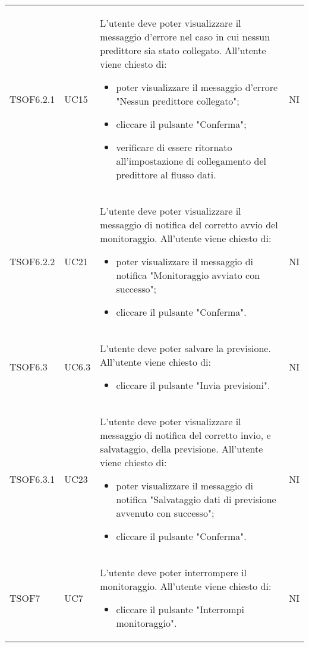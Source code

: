 \begin{longtable}{C{2.5cm} C{2.5cm} L{8cm} C{2cm}}
TSOF6.2.1 & UC15 & L'utente  deve poter visualizzare il messaggio d’errore nel caso in cui nessun predittore sia stato collegato. \newline All’utente viene chiesto di:
\begin{itemize}
	\item poter visualizzare il messaggio d’errore "Nessun predittore collegato";
	\item cliccare il pulsante "Conferma";
	\item verificare di essere ritornato all’impostazione di collegamento del predittore al flusso dati.
\end{itemize}& NI \\
TSOF6.2.2 & UC21 & L'utente  deve poter visualizzare il messaggio di notifica del corretto avvio del monitoraggio. \newline All'utente viene chiesto di: 
\begin{itemize}
	\item poter visualizzare il messaggio di notifica "Monitoraggio avviato con successo";
	\item cliccare il pulsante "Conferma".
\end{itemize} & NI \\
TSOF6.3 & UC6.3 & L'utente  deve poter salvare la previsione. \newline All'utente viene chiesto di: \begin{itemize}
\item cliccare il pulsante "Invia previsioni".
\end{itemize} & NI \\
TSOF6.3.1 & UC23 & L'utente  deve poter visualizzare il messaggio di notifica del corretto invio, e salvataggio, della previsione. \newline All'utente viene chiesto di: 
\begin{itemize}
	\item poter visualizzare il messaggio di notifica "Salvataggio dati di previsione avvenuto con successo";
	\item cliccare il pulsante "Conferma".
\end{itemize} & NI \\
TSOF7 & UC7 & L'utente  deve poter interrompere il monitoraggio. \newline All'utente viene chiesto di: \begin{itemize}
\item cliccare il pulsante "Interrompi monitoraggio".
\end{itemize} & NI \\

\end{longtable}

